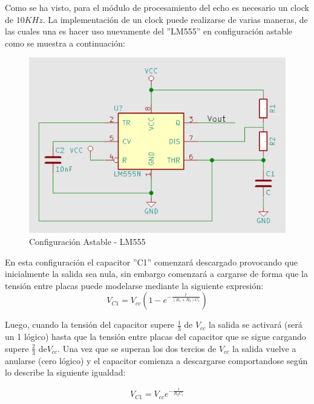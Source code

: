 Como se ha visto, para el módulo de procesamiento del echo es necesario
un clock de $10KHz$. La implementación de un clock puede realizarse
de varias maneras, de las cuales una es hacer uso nuevamente del ''LM555''
en configuración astable como se muestra a continuación:

\begin{figure}[H]
\begin{centering}
\includegraphics[scale=0.4]{astable555.PNG}
\par\end{centering}
\caption{Configuración Astable - LM555}
\end{figure}

En esta configuración el capacitor ''C1'' comenzará descargado provocando
que inicialmente la salida sea nula, sin embargo comenzará a cargarse
de forma que la tensión entre placas puede modelarse mediante la siguiente
expresión: 
\begin{equation}
    V_{C1}=V_{cc}(1-e^{-\frac{t}{(R_{1}+R_{2})C_{1}}})   
\end{equation}


Luego, cuando la tensión del capacitor supere $\frac{1}{3}$ de $V_{cc}$
la salida se activará (será un 1 lógico) hasta que la tensión entre
placas del capacitor que se sigue cargando supere $\frac{2}{3}$ de$V_{cc}$.
Una vez que se superan los dos tercios de $V_{cc}$ la salida vuelve
a anularse (cero lógico) y el capacitor comienza a descargarse comportandose
según lo describe la siguiente igualdad:

\begin{equation}
V_{C1}=V_{cc}e^{-\frac{t}{R_{2}C_{1}}}
\end{equation}

